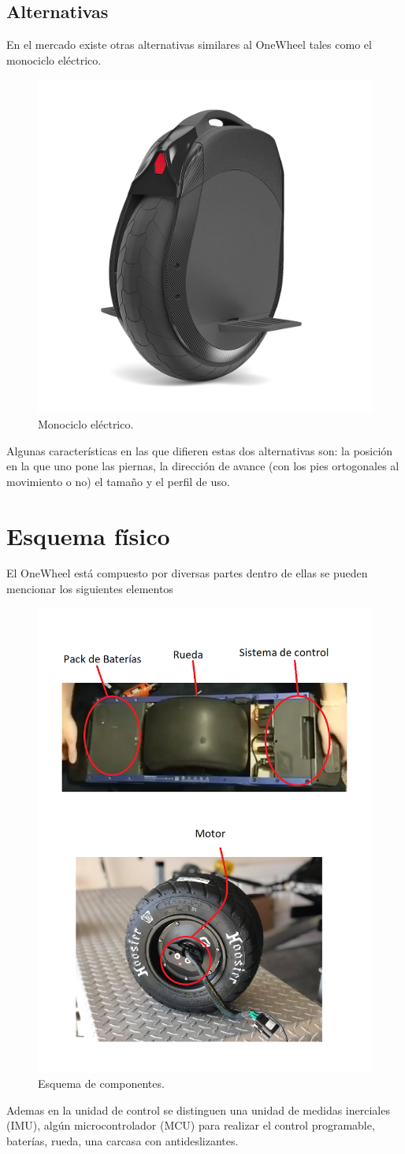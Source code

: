 \subsection{Alternativas}
En el mercado existe otras alternativas similares al OneWheel tales como el monociclo eléctrico.
 \begin{figure}[H]
	\center
	\includegraphics[width=0.4\linewidth, page=1]{Imagenes/antescedentes}
	\caption{Monociclo el\'ectrico.}
	\label{fig:intro:monociclo_electrico}
\end{figure}
Algunas características en las que difieren estas dos alternativas son: la posici\'on en la que uno pone las piernas, la direcci\'on de avance (con los pies ortogonales al movimiento o no)
el tamaño y el perfil de uso.
\section{Esquema f\'isico}
El OneWheel está compuesto por diversas partes dentro de ellas se pueden mencionar los siguientes elementos
 \begin{figure}[H]
	\center
	\includegraphics[width=0.4\linewidth, page=1]{Imagenes/Diagrama}
	\caption{Esquema de componentes.}
	\label{fig:Esq_fisico:diagrama}
\end{figure}
Ademas en la unidad de control se distinguen una unidad de medidas inerciales (IMU), algún microcontrolador (MCU) para realizar el control programable, baterías, rueda, una carcasa con antideslizantes. 



